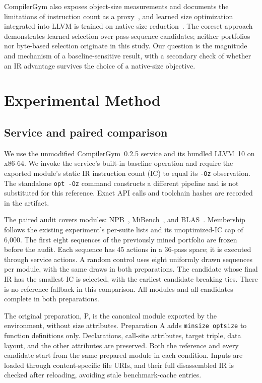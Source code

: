 \documentclass[conference,a4paper]{IEEEtran}
\begin{document}
CompilerGym also exposes object-size measurements and documents the
limitations of instruction count as a proxy~\cite{cgmetrics}, and
learned size optimization integrated into LLVM is trained on native size
reduction~\cite{mlgo}. The coreset approach~\cite{coreset} demonstrates learned selection
over pass-sequence candidates; neither portfolios nor byte-based
selection originate in this study. Our question is the magnitude and
mechanism of a baseline-sensitive result, with a secondary check of
whether an IR advantage survives the choice of a native-size objective.

\section{Experimental Method}
\subsection{Service and paired comparison}
We use the unmodified CompilerGym~0.2.5 service and its bundled LLVM~10
on x86-64. We invoke the service's built-in baseline operation and
require the exported module's static IR instruction count (IC) to equal
its \texttt{-Oz} observation. The
standalone \texttt{opt -Oz} command constructs a different pipeline
and is not substituted for this reference. Exact API calls and
toolchain hashes are recorded in the artifact.

The paired audit covers \AuditCount{} modules: \NpbCount{} NPB~\cite{npb},
\MibenchCount{} MiBench~\cite{mibench}, and \BlasCount{} BLAS~\cite{blas}. Membership follows
the existing experiment's per-suite lists and its unoptimized-IC cap
of 6,000. The first eight sequences of the previously mined portfolio
are frozen before the audit. Each sequence has 45 actions in a
36-pass space; it is executed through service actions. A random
control uses eight uniformly drawn sequences per module, with the
same draws in both preparations. The candidate whose final IR has the
smallest IC is selected, with the earliest candidate breaking ties. There is no
reference fallback in this comparison. All modules and all candidates
complete in both preparations.

The original preparation, P, is the canonical module exported by the
environment, without size attributes. Preparation A adds
\texttt{minsize optsize} to function definitions only. Declarations,
call-site attributes, target triple, data layout, and the other
attributes are preserved. Both the reference and every candidate
start from the same prepared module in each condition. Inputs are
loaded through content-specific file URIs, and their full disassembled
IR is checked after reloading, avoiding stale benchmark-cache entries.
\end{document}
